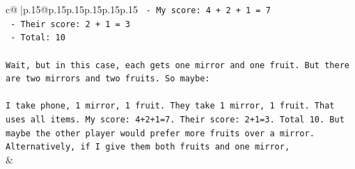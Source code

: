 \documentclass{article}
\begin{document}
{\begin{supertabular}{c@{$\;$}|p{.15\linewidth}@{}p{.15\linewidth}p{.15\linewidth}p{.15\linewidth}p{.15\linewidth}p{.15\linewidth}}
{{{\texttt{   {-} My score: 4 + 2 + 1 = 7} \\
\texttt{   {-} Their score: 2 + 1 = 3} \\
\texttt{   {-} Total: 10} \\
\\ 
\texttt{Wait, but in this case, each gets one mirror and one fruit. But there are two mirrors and two fruits. So maybe:} \\
\\ 
\texttt{I take phone, 1 mirror, 1 fruit. They take 1 mirror, 1 fruit. That uses all items. My score: 4+2+1=7. Their score: 2+1=3. Total 10. But maybe the other player would prefer more fruits over a mirror. Alternatively, if I give them both fruits and one mirror,} \\
            }
        }
    }
    & \\ \\


\end{supertabular}}
\end{document}
